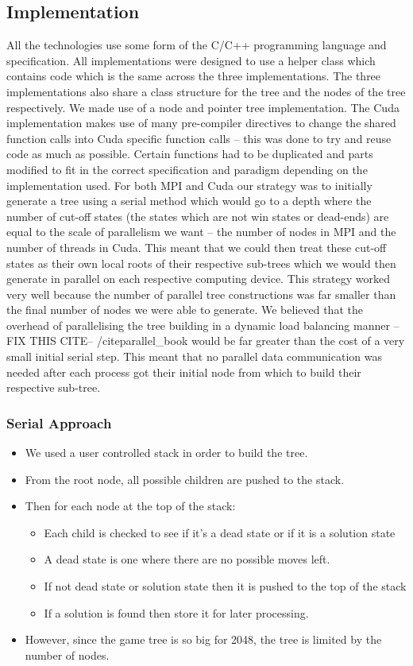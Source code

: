 \documentclass[11pt]{article}
\begin{document}
\begin{page}
\subsection{Implementation}
All the technologies use some form of the C/C++ programming language and specification. All implementations were designed to use a helper class which contains code which is the same across the three implementations. The three implementations also share a class structure for the tree and the nodes of the tree respectively. We made use of a node and pointer tree implementation. The Cuda implementation makes use of many pre-compiler directives to change the shared function calls into Cuda specific function calls – this was done to try and reuse code as much as possible. Certain functions had to be duplicated and parts modified to fit in the correct specification and paradigm depending on the implementation used.
For both MPI and Cuda our strategy was to initially generate a tree using a serial method which would go to a depth where the number of cut-off states (the states which are not win states or dead-ends) are equal to the scale of parallelism we want – the number of nodes in MPI and the number of threads in Cuda. This meant that we could then treat these cut-off states as their own local roots of their respective sub-trees which we would then generate in parallel on each respective computing device. This strategy worked very well because the number of parallel tree constructions was far smaller than the final number of nodes we were able to generate. We believed that the overhead of parallelising the tree building in a dynamic load balancing manner --FIX THIS CITE-- /cite{parallel_book}  would be far greater than the cost of a very small initial serial step. This meant that no parallel data communication was needed after each process got their initial node from which to build their respective sub-tree.

\subsubsection{Serial Approach}
	\begin{itemize}
		\item We used a user controlled stack in order to build the tree.
		\item From the root node, all possible children are pushed to the stack.
		\item Then for each node at the top of the stack:
		  \begin{itemize}[<.(1)->]
		    \item Each child is checked to see if it’s a dead state or if it is a solution state
		    \item A dead state is one where there are no possible moves left.
		    \item If not dead state or solution state then it is pushed to the top of the stack
		    \item If a solution is found then store it for later processing.
		  \end{itemize}
		\item However, since the game tree is so big for 2048, the tree is limited by the number of nodes.
	\end{itemize}


\end{page}
\end{document}
